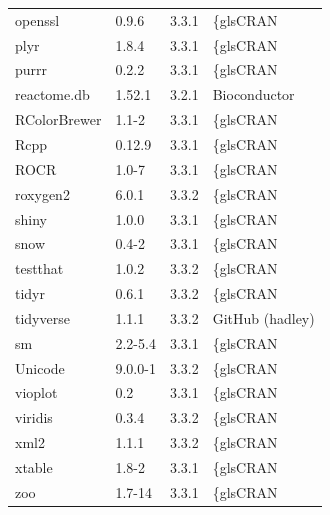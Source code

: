 \begin{longtable}{llll}
\rowcolor{black!10}
openssl      & 0.9.6          & 3.3.1 & \{gls{CRAN}            \\
\rowcolor{black!5}
plyr         & 1.8.4          & 3.3.1 & \{gls{CRAN}            \\
\rowcolor{black!10}
purrr        & 0.2.2          & 3.3.1 & \{gls{CRAN}            \\
\rowcolor{black!5}
reactome.db  & 1.52.1         & 3.2.1 & Bioconductor    \\
\rowcolor{black!10}
RColorBrewer & 1.1-2          & 3.3.1 & \{gls{CRAN}            \\
\rowcolor{black!5}
Rcpp         & 0.12.9         & 3.3.1 & \{gls{CRAN}            \\
\rowcolor{black!10}
ROCR         & 1.0-7          & 3.3.1 & \{gls{CRAN}            \\
\rowcolor{black!5}
roxygen2     & 6.0.1          & 3.3.2 & \{gls{CRAN}            \\
\rowcolor{black!10}
shiny        & 1.0.0          & 3.3.1 & \{gls{CRAN}            \\
\rowcolor{black!5}
snow         & 0.4-2          & 3.3.1 & \{gls{CRAN}            \\
\rowcolor{black!10}
testthat     & 1.0.2          & 3.3.2 & \{gls{CRAN}            \\
\rowcolor{black!5}
tidyr        & 0.6.1          & 3.3.2 & \{gls{CRAN}            \\
\rowcolor{black!10}
tidyverse    & 1.1.1          & 3.3.2 & GitHub (hadley) \\
\rowcolor{black!5}
sm           & 2.2-5.4        & 3.3.1 & \{gls{CRAN}            \\
\rowcolor{black!10}
Unicode      & 9.0.0-1        & 3.3.2 & \{gls{CRAN}            \\
\rowcolor{black!5}
vioplot      & 0.2            & 3.3.1 & \{gls{CRAN}            \\
\rowcolor{black!10}
viridis      & 0.3.4          & 3.3.2 & \{gls{CRAN}            \\
\rowcolor{black!5}
xml2         & 1.1.1          & 3.3.2 & \{gls{CRAN}            \\
\rowcolor{black!10}
xtable       & 1.8-2          & 3.3.1 & \{gls{CRAN}            \\
\rowcolor{black!5}
zoo          & 1.7-14         & 3.3.1 & \{gls{CRAN}            \\

\end{longtable}
